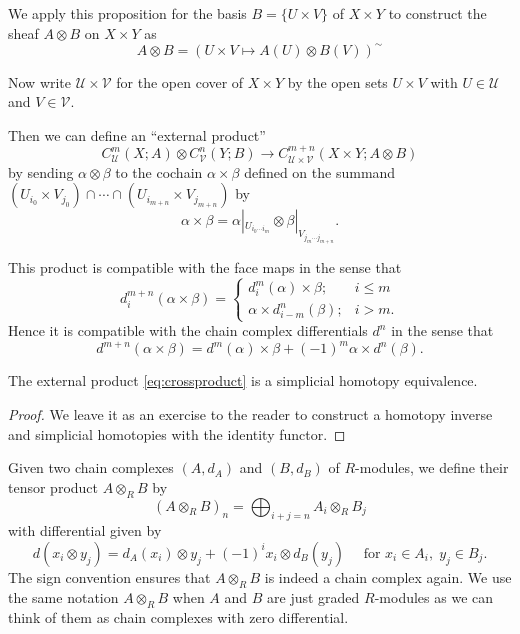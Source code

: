 \documentclass[a4paper,openany]{scrbook}
\begin{document}
We apply this proposition for the basis $B=\{U \times V\}$ of $X \times Y$ to construct the sheaf $A \otimes B$ on $X \times Y$ as
\[
A \otimes B = (U \times V \mapsto A(U) \otimes B(V))^{\sim}
\]

Now write $\mathcal U \times \mathcal V$ for the open cover of $X \times Y$ by the open sets $U \times V$ with $U \in \mathcal U$ and $V \in \mathcal V$.

Then we can define an “external product”
\begin{equation}\label{eq:crossproduct}
C^m_{\mathcal U}(X;A) \otimes C^n_{\mathcal V}(Y;B) \to C^{m+n}_{\mathcal U \times \mathcal V}(X\times Y;A \otimes B)
\end{equation}
by sending $\alpha \otimes \beta$ to the cochain $\alpha \times \beta$ defined on the summand $(U_{i_0} \times V_{j_0}) \cap \cdots \cap (U_{i_{m+n}} \times V_{j_{m+n}})$ by
\[
\alpha \times \beta = \alpha|_{U_{i_0\cdots i_m}} \otimes \beta|_{V_{j_m\cdots j_{m+n}}}.
\]

This product is compatible with the face maps in the sense that
\[
d^{m+n}_i(\alpha \times \beta) = \begin{cases}
d^m_i(\alpha) \times \beta; & i \leq m\\
\alpha \times d^n_{i-m}(\beta); & i > m.
\end{cases}
\]
Hence it is compatible with the chain complex differentials $d^n$ in the sense that
\[
d^{m+n}(\alpha \times \beta) = d^m(\alpha) \times \beta + (-1)^m \alpha \times d^n(\beta).
\]

\begin{thm}\label{thm:Eilenberg-Zilber}
The external product \eqref{eq:crossproduct} is a simplicial homotopy equivalence.
\end{thm}
\begin{proof}
We leave it as an exercise to the reader to construct a homotopy inverse and simplicial homotopies with the identity functor.
\end{proof}

Given two chain complexes $(A,d_A)$ and $(B,d_B)$ of $R$-modules, we define their tensor product $A \otimes_R B$ by
\[
(A \otimes_R B)_n = \bigoplus_{i+j=n} A_i \otimes_R B_j
\]
with differential given by
\[
d(x_i \otimes y_j) = d_A(x_i) \otimes y_j + (-1)^i x_i \otimes d_B(y_j) \quad \text{ for } x_i \in A_i,\; y_j \in B_j.
\]
The sign convention ensures that $A \otimes_R B$ is indeed a chain complex again. We use the same notation $A \otimes_R B$ when $A$ and $B$ are just graded $R$-modules as we can think of them as chain complexes with zero differential.
\end{document}
